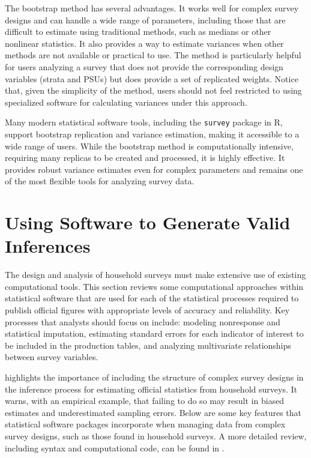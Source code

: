 \documentclass[
  12pt,
]{book}
\begin{document}
The bootstrap method has several advantages. It works well for complex survey designs and can handle a wide range of parameters, including those that are difficult to estimate using traditional methods, such as medians or other nonlinear statistics. It also provides a way to estimate variances when other methods are not available or practical to use. The method is particularly helpful for users analyzing a survey that does not provide the corresponding design variables (strata and PSUs) but does provide a set of replicated weights. Notice that, given the simplicity of the method, users should not feel restricted to using specialized software for calculating variances under this approach.

Many modern statistical software tools, including the \texttt{survey} package in R, support bootstrap replication and variance estimation, making it accessible to a wide range of users. While the bootstrap method is computationally intensive, requiring many replicas to be created and processed, it is highly effective. It provides robust variance estimates even for complex parameters and remains one of the most flexible tools for analyzing survey data.

\hypertarget{using-software-to-generate-valid-inferences}{%
\section{Using Software to Generate Valid Inferences}\label{using-software-to-generate-valid-inferences}}

The design and analysis of household surveys must make extensive use of existing computational tools. This section reviews some computational approaches within statistical software that are used for each of the statistical processes required to publish official figures with appropriate levels of accuracy and reliability. Key processes that analysts should focus on include: modeling nonresponse and statistical imputation, estimating standard errors for each indicator of interest to be included in the production tables, and analyzing multivariate relationships between survey variables.

\citet[Section 7.8]{United_Nations_2005} highlights the importance of including the structure of complex survey designs in the inference process for estimating official statistics from household surveys. It warns, with an empirical example, that failing to do so may result in biased estimates and underestimated sampling errors. Below are some key features that statistical software packages incorporate when managing data from complex survey designs, such as those found in household surveys. A more detailed review, including syntax and computational code, can be found in \citet[Appendix A]{Heeringa_West_Berglund_2017}.
\end{document}
